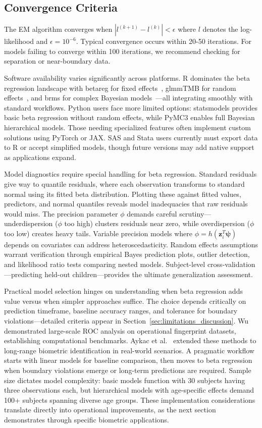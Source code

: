 \documentclass[10pt,journal,compsoc]{IEEEtran}
\begin{document}
\subsection{Convergence Criteria}
The EM algorithm converges when $|l^{(k+1)} - l^{(k)}| < \epsilon$ where $l$ denotes the log-likelihood and $\epsilon = 10^{-6}$. Typical convergence occurs within 20-50 iterations. For models failing to converge within 100 iterations, we recommend checking for separation or near-boundary data.

Software availability varies significantly across platforms. R dominates the beta regression landscape with betareg for fixed effects~\cite{cribari2010}, glmmTMB for random effects~\cite{brooks2017}, and brms for complex Bayesian models~\cite{burkner2017}---all integrating smoothly with standard workflows. Python users face more limited options: statsmodels provides basic beta regression without random effects, while PyMC3 enables full Bayesian hierarchical models. Those needing specialized features often implement custom solutions using PyTorch or JAX. SAS and Stata users currently must export data to R or accept simplified models, though future versions may add native support as applications expand.

Model diagnostics require special handling for beta regression. Standard residuals give way to quantile residuals, where each observation transforms to standard normal using its fitted beta distribution. Plotting these against fitted values, predictors, and normal quantiles reveals model inadequacies that raw residuals would miss. The precision parameter $\phi$ demands careful scrutiny---underdispersion ($\phi$ too high) clusters residuals near zero, while overdispersion ($\phi$ too low) creates heavy tails. Variable precision models where $\phi = h(\mathbf{z}_i^T \boldsymbol{\psi})$ depends on covariates can address heteroscedasticity. Random effects assumptions warrant verification through empirical Bayes prediction plots, outlier detection, and likelihood ratio tests comparing nested models. Subject-level cross-validation---predicting held-out children---provides the ultimate generalization assessment.

Practical model selection hinges on understanding when beta regression adds value versus when simpler approaches suffice. The choice depends critically on prediction timeframe, baseline accuracy ranges, and tolerance for boundary violations---detailed criteria appear in Section~\ref{sec:limitations_discussion}. Wu~\cite{wu2008} demonstrated large-scale ROC analysis on operational fingerprint datasets, establishing computational benchmarks. Aykac et al.~\cite{aykac2024} extended these methods to long-range biometric identification in real-world scenarios. A pragmatic workflow starts with linear models for baseline comparison, then moves to beta regression when boundary violations emerge or long-term predictions are required. Sample size dictates model complexity: basic models function with 30 subjects having three observations each, but hierarchical models with age-specific effects demand 100+ subjects spanning diverse age groups. These implementation considerations translate directly into operational improvements, as the next section demonstrates through specific biometric applications.
\end{document}
